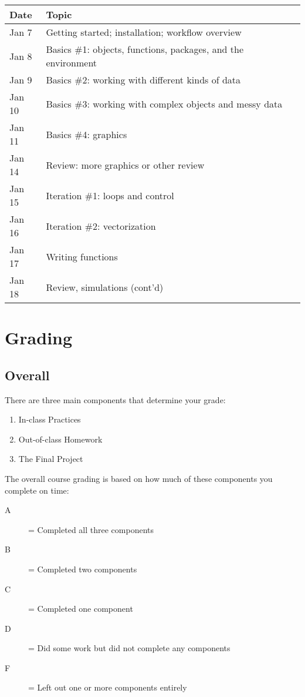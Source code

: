 \documentclass{tufte-handout}
\begin{document}
\begin{center}
\begin{tabular}{ll}
Date & Topic\\
\hline
Jan 7 & Getting started; installation; workflow overview\\
Jan 8 & Basics \#1: objects, functions, packages, and the environment\\
Jan 9 & Basics \#2: working with different kinds of data\\
Jan 10 & Basics \#3: working with complex objects and messy data\\
Jan 11 & Basics \#4: graphics\\
Jan 14 & Review: more graphics or other review\\
Jan 15 & Iteration \#1: loops and control\\
Jan 16 & Iteration \#2: vectorization\\
Jan 17 & Writing functions\\
Jan 18 & Review, simulations (cont'd)\\
\end{tabular}
\end{center}

\section*{Grading}
\label{sec:org87ba4ca}
\subsection*{Overall}
\label{sec:org7f9c58c}
There are three main components that determine your grade:
\begin{enumerate}
\item In-class Practices
\item Out-of-class Homework
\item The Final Project
\end{enumerate}

The overall course grading is based on how much of these components you complete on time:
\begin{description}
\item[{A}] = Completed all three components
\item[{B}] = Completed two components
\item[{C}] = Completed one component
\item[{D}] = Did some work but did not complete any components
\item[{F}] = Left out one or more components entirely
\end{description}
\end{document}
